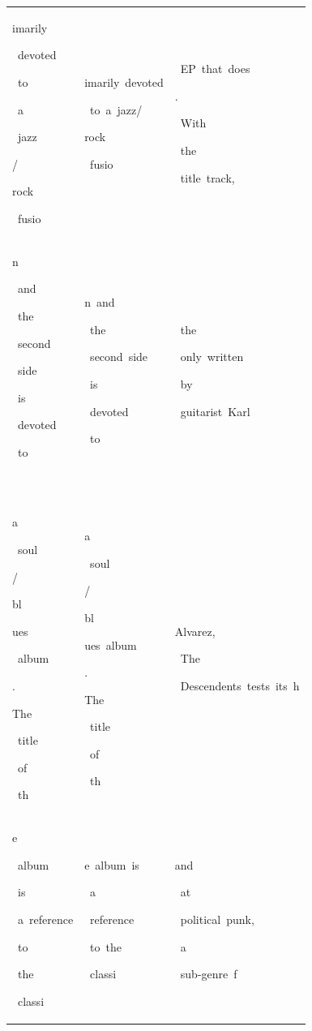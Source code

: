 \begin{table}[h]
\begin{tabular}{ l | l | l }
 \colorbox{cm_40!40}{\strut imarily}\colorbox{cm_30!40}{\strut \ devoted}\colorbox{cm_32!40}{\strut \ to}\colorbox{cm_27!40}{\strut \ a}\colorbox{cm_28!40}{\strut \ jazz}\colorbox{cm_34!40}{\strut /}\colorbox{cm_28!40}{\strut rock}\colorbox{cm_34!40}{\strut \ fusio} & \colorbox{cm_0!40}{\strut imarily\ devoted}\colorbox{cm_12!40}{\strut \ to\ a\ jazz/}\colorbox{cm_0!40}{\strut rock}\colorbox{cm_12!40}{\strut \ fusio} & \colorbox{cm_0!40}{\strut \ EP\ that\ does}\colorbox{cm_12!40}{\strut .}\colorbox{cm_0!40}{\strut \ With}\colorbox{cm_12!40}{\strut \ the}\colorbox{cm_0!40}{\strut \ title\ track,} \\ 
 \colorbox{cm_34!40}{\strut n}\colorbox{cm_30!40}{\strut \ and}\colorbox{cm_37!40}{\strut \ the}\colorbox{cm_32!40}{\strut \ second}\colorbox{cm_34!40}{\strut \ side}\colorbox{cm_31!40}{\strut \ is}\colorbox{cm_33!40}{\strut \ devoted}\colorbox{cm_32!40}{\strut \ to}\colorbox{cm_30!40}{\strut \ } & \colorbox{cm_12!40}{\strut n\ and}\colorbox{cm_25!40}{\strut \ the}\colorbox{cm_0!40}{\strut \ second\ side}\colorbox{cm_12!40}{\strut \ is}\colorbox{cm_0!40}{\strut \ devoted}\colorbox{cm_12!40}{\strut \ to\ } & \colorbox{cm_12!40}{\strut \ the}\colorbox{cm_0!40}{\strut \ only\ written}\colorbox{cm_12!40}{\strut \ by}\colorbox{cm_0!40}{\strut \ guitarist\ Karl\ } \\ 
 \colorbox{cm_30!40}{\strut a}\colorbox{cm_22!40}{\strut \ soul}\colorbox{cm_35!40}{\strut /}\colorbox{cm_33!40}{\strut bl}\colorbox{cm_32!40}{\strut ues}\colorbox{cm_26!40}{\strut \ album}\colorbox{cm_31!40}{\strut .}\colorbox{cm_36!40}{\strut }\colorbox{cm_33!40}{\strut }\colorbox{cm_35!40}{\strut The}\colorbox{cm_40!40}{\strut \ title}\colorbox{cm_33!40}{\strut \ of}\colorbox{cm_34!40}{\strut \ th} & \colorbox{cm_12!40}{\strut a}\colorbox{cm_0!40}{\strut \ soul}\colorbox{cm_12!40}{\strut /}\colorbox{cm_0!40}{\strut bl}\colorbox{cm_12!40}{\strut ues\ album}\colorbox{cm_25!40}{\strut .}\colorbox{cm_38!40}{\strut }\colorbox{cm_51!40}{\strut }\colorbox{cm_38!40}{\strut The}\colorbox{cm_0!40}{\strut \ title}\colorbox{cm_12!40}{\strut \ of}\colorbox{cm_25!40}{\strut \ th} & \colorbox{cm_0!40}{\strut Alvarez,}\colorbox{cm_12!40}{\strut \ The}\colorbox{cm_0!40}{\strut \ Descendents\ tests\ its\ h} \\ 
 \colorbox{cm_34!40}{\strut e}\colorbox{cm_31!40}{\strut \ album}\colorbox{cm_28!40}{\strut \ is}\colorbox{cm_33!40}{\strut \ a\ reference}\colorbox{cm_32!40}{\strut \ to}\colorbox{cm_28!40}{\strut \ the}\colorbox{cm_30!40}{\strut \ classi} & \colorbox{cm_25!40}{\strut e\ album\ is}\colorbox{cm_38!40}{\strut \ a}\colorbox{cm_0!40}{\strut \ reference}\colorbox{cm_12!40}{\strut \ to\ the}\colorbox{cm_0!40}{\strut \ classi} & \colorbox{cm_0!40}{\strut and}\colorbox{cm_12!40}{\strut \ at}\colorbox{cm_0!40}{\strut \ political\ punk,}\colorbox{cm_12!40}{\strut \ a}\colorbox{cm_0!40}{\strut \ sub-genre\ f} \\ 

\end{tabular}
\end{table}
